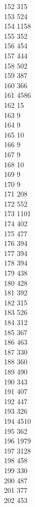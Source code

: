 { 152	315 \\
 153	524 \\
 154	1158 \\
 155	352 \\
 156	454 \\
 157	444 \\
 158	502 \\
 159	387 \\
 160	366 \\
 161	4586 \\
 162	15 \\
 163	9 \\
 164	9 \\
 165	10 \\
 166	9 \\
 167	9 \\
 168	10 \\
 169	9 \\
 170	9 \\
 171	208 \\
 172	552 \\
 173	1101 \\
 174	402 \\
 175	477 \\
 176	394 \\
 177	394 \\
 178	394 \\
 179	438 \\
 180	428 \\
 181	392 \\
 182	315 \\
 183	526 \\
 184	312 \\
 185	367 \\
 186	463 \\
 187	330 \\
 188	360 \\
 189	490 \\
 190	343 \\
 191	407 \\
 192	447 \\
 193	326 \\
 194	4510 \\
 195	362 \\
 196	1979 \\
 197	3128 \\
 198	458 \\
 199	330 \\
 200	487 \\
 201	377 \\
 202	453 \\
}
